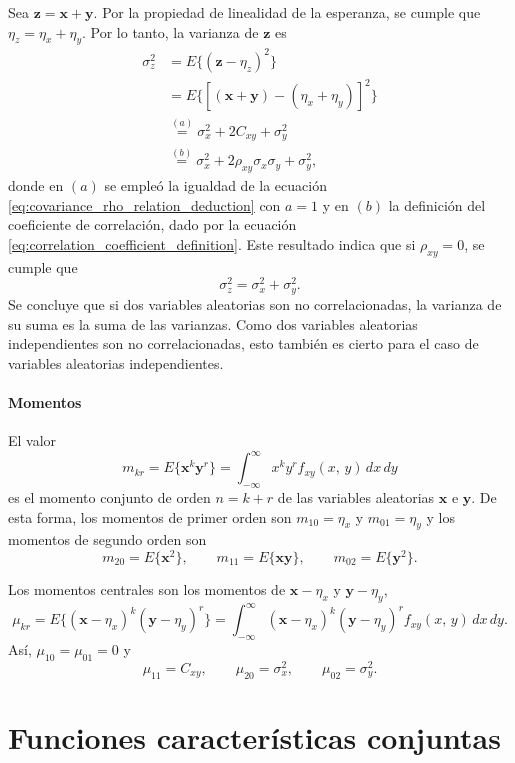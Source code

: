 \documentclass[a4paper]{report}
\newcommand{\x}{\mathbf{x}}
\newcommand{\y}{\mathbf{y}}
\newcommand{\z}{\mathbf{z}}
\begin{document}
Sea \(\z=\x+\y\). Por la propiedad de linealidad de la esperanza, se cumple que \(\eta_z=\eta_x+\eta_y\). Por lo tanto, la varianza de \(\z\) es
\begin{align}\label{eq:sum_of_rv_variance}
 \sigma_z^2&=E\{(\z-\eta_z)^2\}\nonumber\\
   &=E\{\left[(\x+\y)-(\eta_x+\eta_y)\right]^2\}\nonumber\\
   &\overset{(a)}{=}\sigma_x^2+2C_{xy}+\sigma_y^2\nonumber\\
   &\overset{(b)}{=}\sigma_x^2+2\rho_{xy}\sigma_x\sigma_y+\sigma_y^2,
\end{align}
donde en \((a)\) se empleó la igualdad de la ecuación \ref{eq:covariance_rho_relation_deduction} con \(a=1\) y en \((b)\) la definición del coeficiente de correlación, dado por la ecuación \ref{eq:correlation_coefficient_definition}. Este resultado indica que si \(\rho_{xy}=0\), se cumple que
\[
 \sigma_z^2=\sigma_x^2+\sigma_y^2.
\]
Se concluye que si dos variables aleatorias son no correlacionadas, la varianza de su suma es la suma de las varianzas. Como dos variables aleatorias independientes son no correlacionadas, esto también es cierto para el caso de variables aleatorias independientes.

\paragraph{Momentos}

El valor
\[
 m_{kr}=E\{\x^k\y^r\}=\int_{-\infty}^{\infty}x^ky^rf_{xy}(x,\,y)\,dx\,dy
\]
es el momento conjunto de orden \(n=k+r\) de las variables aleatorias \(\x\) e \(\y\). De esta forma, los momentos de primer orden son \(m_{10}=\eta_x\) y \(m_{01}=\eta_y\) y los momentos de segundo orden son
\[
 m_{20}=E\{\x^2\},\qquad m_{11}=E\{\x\y\},\qquad m_{02}=E\{\y^2\}.
\]

Los momentos centrales son los momentos de \(\x-\eta_x\) y \(\y-\eta_y\),
\[
 \mu_{kr}=E\{(\x-\eta_x)^k(\y-\eta_y)^r\}=\int_{-\infty}^{\infty}(\x-\eta_x)^k(\y-\eta_y)^rf_{xy}(x,\,y)\,dx\,dy.
\]
Así, \(\mu_{10}=\mu_{01}=0\) y 
\[
 \mu_{11}=C_{xy},\qquad \mu_{20}=\sigma_x^2,\qquad \mu_{02}=\sigma_y^2.
\]

\section{Funciones características conjuntas}\label{sec:joint_characteristic_function}
\end{document}
